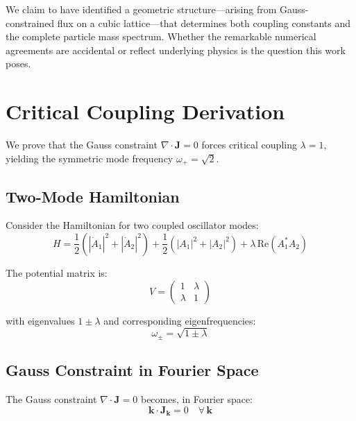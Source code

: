 \documentclass[11pt,a4paper]{article}
\theoremstyle{definition}
\theoremstyle{remark}
\begin{document}
We claim to have identified a geometric structure---arising from Gauss-constrained flux on a cubic lattice---that determines both coupling constants and the complete particle mass spectrum. Whether the remarkable numerical agreements are accidental or reflect underlying physics is the question this work poses.

\appendix

\section{Critical Coupling Derivation}
\label{app:critical}

We prove that the Gauss constraint $\nabla \cdot \mathbf{J} = 0$ forces critical coupling $\lambda = 1$, yielding the symmetric mode frequency $\omega_+ = \sqrt{2}$.

\subsection*{Two-Mode Hamiltonian}

Consider the Hamiltonian for two coupled oscillator modes:
\begin{equation}
    H = \frac{1}{2}(|\dot{A}_1|^2 + |\dot{A}_2|^2) + \frac{1}{2}(|A_1|^2 + |A_2|^2) + \lambda\, \text{Re}(A_1^* A_2)
\end{equation}

The potential matrix is:
\begin{equation}
    V = \begin{pmatrix} 1 & \lambda \\ \lambda & 1 \end{pmatrix}
\end{equation}

with eigenvalues $1 \pm \lambda$ and corresponding eigenfrequencies:
\begin{equation}
    \omega_\pm = \sqrt{1 \pm \lambda}
\end{equation}

\subsection*{Gauss Constraint in Fourier Space}

The Gauss constraint $\nabla \cdot \mathbf{J} = 0$ becomes, in Fourier space:
\begin{equation}
    \mathbf{k} \cdot \mathbf{J}_\mathbf{k} = 0 \quad \forall\, \mathbf{k}
\end{equation}
\end{document}
